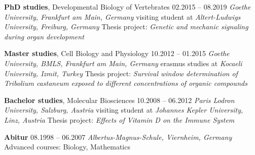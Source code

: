 \documentclass[11pt,singlespacinge,twoside]{reedthesis} %
\theoremstyle{definition}
\theoremstyle{definition}
\theoremstyle{definition}
\theoremstyle{remark}
\begin{document}
\makebox[3cm][l]{}


\vspace{0.3cm}

 \hrulefill
\vspace{0.2cm}

\noindent \textbf{PhD studies}, Developmental Biology of Vertebrates \hfill 02.2015 -- 08.2019\newline
\emph{Goethe University, Frankfurt am Main, Germany}\newline
visiting student at \emph{Altert-Ludwigs University, Freiburg, Germany}\newline
Thesis project: \emph{Genetic and mechanic signaling during organ development}

\vspace{0.3cm}

\noindent \textbf{Master studies}, Cell Biology and Physiology \hfill 10.2012 -- 01.2015\newline
\emph{Goethe University, BMLS, Frankfurt am Main, Germany}\newline
erasmus studies at \emph{Kocaeli University, Izmit, Turkey}\newline
Thesis project: \emph{Survival window determination of Tribolium castaneum \newline exposed to different concentrations of organic compounds}

\vspace{0.3cm}

\noindent \textbf{Bachelor studies}, Molecular Biosciences \hfill 10.2008 -- 06.2012\newline
\emph{Paris Lodron University, Salzburg, Austria}\newline
visiting student at \emph{Johannes Kepler University, Linz, Austria}\newline
Thesis project: \emph{Effects of Vitamin D on the Immune System}

\vspace{0.3cm}

\noindent \textbf{Abitur} \hfill 08.1998 -- 06.2007\newline
\emph{Albertus-Magnus-Schule, Viernheim, Germany}\newline
Advanced courses: Biology, Mathematics

\vspace{0.3cm}
\end{document}
